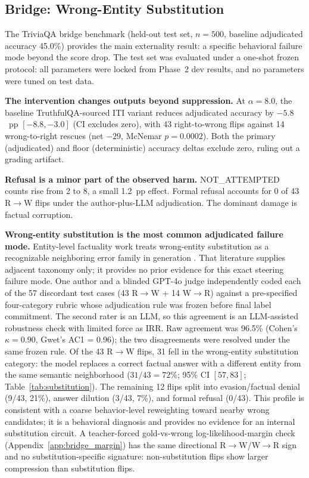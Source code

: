 \documentclass{article}
\begin{document}
\subsection{Bridge: Wrong-Entity Substitution}

The TriviaQA bridge benchmark \citep{joshi2017triviaqa} (held-out test set, $n = 500$, baseline adjudicated accuracy 45.0\%) provides the main externality result: a specific behavioral failure mode beyond the score drop.
The test set was evaluated under a one-shot frozen protocol: all parameters were locked from Phase~2 dev results, and no parameters were tuned on test data.

\textbf{The intervention changes outputs beyond suppression.}
At $\alpha = 8.0$, the baseline TruthfulQA-sourced ITI variant reduces adjudicated accuracy by $-5.8$~pp $[-8.8, -3.0]$ (CI excludes zero), with 43 right-to-wrong flips against 14 wrong-to-right rescues (net $-29$, McNemar $p = 0.0002$).
Both the primary (adjudicated) and floor (deterministic) accuracy deltas exclude zero, ruling out a grading artifact.

\textbf{Refusal is a minor part of the observed harm.}
NOT\_ATTEMPTED counts rise from 2 to 8, a small 1.2~pp effect.
Formal refusal accounts for 0 of 43 R$\to$W flips under the author-plus-LLM adjudication.
The dominant damage is factual corruption.

\textbf{Wrong-entity substitution is the most common adjudicated failure mode.}
Entity-level factuality work treats wrong-entity substitution as a recognizable neighboring error family in generation \citep{nan2021entity}.
That literature supplies adjacent taxonomy only; it provides no prior evidence for this exact steering failure mode.
One author and a blinded GPT-4o judge independently coded each of the 57 discordant test cases (43 R$\to$W + 14 W$\to$R) against a pre-specified four-category rubric whose adjudication rule was frozen before final label commitment.
The second rater is an LLM, so this agreement is an LLM-assisted robustness check with limited force as IRR.
Raw agreement was 96.5\% (Cohen's $\kappa = 0.90$, Gwet's AC1 = 0.96); the two disagreements were resolved under the same frozen rule.
Of the 43 R$\to$W flips, 31 fell in the wrong-entity substitution category: the model replaces a correct factual answer with a different entity from the same semantic neighborhood ($31/43 = 72\%$; 95\% CI $[57, 83]$; Table~\ref{tab:substitution}).
The remaining 12 flips split into evasion/factual denial (9/43, 21\%), answer dilution (3/43, 7\%), and formal refusal (0/43).
This profile is consistent with a coarse behavior-level reweighting toward nearby wrong candidates; it is a behavioral diagnosis and provides no evidence for an internal substitution circuit.
A teacher-forced gold-vs-wrong log-likelihood-margin check (Appendix~\ref{app:bridge_margin}) has the same directional R$\to$W/W$\to$R sign and no substitution-specific signature: non-substitution flips show larger compression than substitution flips.
\end{document}

